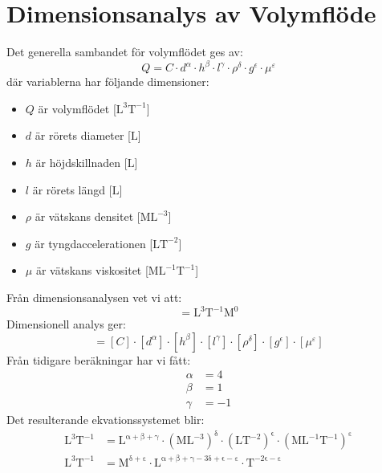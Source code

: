 \documentclass[a4paper,12pt]{article}
\begin{document}
\section{Dimensionsanalys av Volymflöde}
Det generella sambandet för volymflödet ges av:
\begin{equation}
    Q = C \cdot d^\alpha \cdot h^\beta \cdot l^\gamma \cdot \rho^\delta \cdot g^\epsilon \cdot \mu^\varepsilon
    \label{eq:general_flow}
\end{equation}
%
där variablerna har följande dimensioner:
\begin{itemize}
    \item $Q$ är volymflödet [$\mathrm{L^3T^{-1}}$]
    \item $d$ är rörets diameter [$\mathrm{L}$]
    \item $h$ är höjdskillnaden [$\mathrm{L}$]
    \item $l$ är rörets längd [$\mathrm{L}$]
    \item $\rho$ är vätskans densitet [$\mathrm{ML^{-3}}$]
    \item $g$ är tyngdaccelerationen [$\mathrm{LT^{-2}}$]
    \item $\mu$ är vätskans viskositet [$\mathrm{ML^{-1}T^{-1}}$]
\end{itemize}
%
Från dimensionsanalysen vet vi att:
\begin{equation}
    [Q] = \mathrm{L^3T^{-1}M^0}
    \label{eq:dim_Q}
\end{equation}
%
Dimensionell analys ger:
\begin{equation}
    [Q] = [C] \cdot [d^\alpha] \cdot [h^\beta] \cdot [l^\gamma] \cdot [\rho^\delta] \cdot [g^\epsilon] \cdot [\mu^\varepsilon]
    \label{eq:dim_analysis}
\end{equation}
%
Från tidigare beräkningar har vi fått:
\begin{align}
    \alpha &= 4 \label{eq:alpha} \\
    \beta &= 1 \label{eq:beta} \\
    \gamma &= -1 \label{eq:gamma}
\end{align}
%
Det resulterande ekvationssystemet blir:
\begin{align}
    \mathrm{L^3T^{-1}} &= \mathrm{L^{\alpha + \beta + \gamma}} \cdot 
    \mathrm{(ML^{-3})^\delta} \cdot \mathrm{(LT^{-2})^\epsilon} \cdot 
    \mathrm{(ML^{-1}T^{-1})^\varepsilon} \\
    \mathrm{L^3T^{-1}} &= \mathrm{M^{\delta + \varepsilon}} \cdot 
    \mathrm{L^{\alpha + \beta + \gamma - 3\delta + \epsilon - \varepsilon}} \cdot 
    \mathrm{T^{-2\epsilon - \varepsilon}}
\end{align}
\end{document}
